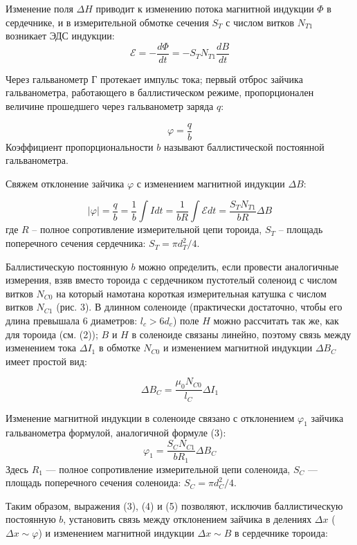 Изменение поля $\Delta H$ приводит к изменению
потока магнитной индукции $\Phi$ в
сердечнике, и в измерительной обмотке
сечения $S_T$ с числом витков $N_{T1}$ возникает
ЭДС индукции:
\[
    \mathscr{E} = - \frac{d\Phi}{dt} =
    -S_T N_{T1} \frac{dB}{dt}
\]

Через гальванометр Г протекает импульс
тока; первый отброс зайчика
гальванометра, работающего в
баллистическом режиме, пропорционален
величине прошедшего через гальванометр
заряда $q$:

\[
\varphi = \frac{q}{b}
\]
Коэффициент пропорциональности $b$ 
называют баллистической постоянной
гальванометра.

Свяжем отклонение зайчика $\varphi$ с
изменением магнитной индукции $\Delta
B$:

\begin{equation}
    |\varphi| = \frac{q}{b} =
    \frac{1}{b}\int I dt = \frac{1}{bR}
    \int \mathscr{E} dt = \frac{S_T
    N_{T1}}{bR}\Delta B
\end{equation}
где $R$ -- полное сопротивление
измерительной цепи тороида, $S_T$ --
площадь поперечного сечения сердечника:
$S_T = \pi d_T^2/4$.

Баллистическую постоянную $b$ можно
определить, если провести аналогичные
измерения, взяв вместо тороида с
сердечником пустотелый соленоид с числом
витков $N_{C0}$ на который намотана короткая
измерительная катушка с числом витков
$N_{C1}$ (рис. 3). В длинном соленоиде
(практически достаточно, чтобы его длина
превышала 6 диаметров: $l_c > 6d_c$)
поле $H$
можно рассчитать так же, как для тороида
(см. (2)); $B$ и $H$ в соленоиде связаны
линейно, поэтому связь между изменением
тока $\Delta I_1$ в обмотке $N_{C0}$ и изменением
магнитной индукции $\Delta B_C$ имеет простой
вид:

\begin{equation}
    \Delta B_C = \frac{\mu_0
    N_{C0}}{l_C}\Delta I_1
\end{equation}

Изменение магнитной индукции в соленоиде
связано с отклонением $\varphi_1$ зайчика
гальванометра формулой, аналогичной
формуле (3):
\begin{equation}
    \varphi_1 = \frac{S_C
    N_{C1}}{bR_1}\Delta B_C
\end{equation}
Здесь $R_1$ — полное сопротивление
измерительной цепи соленоида, $S_C$ —
площадь поперечного сечения соленоида:
$S_C = \pi d_C^2/4$.

Таким образом, выражения (3), (4) и (5)
позволяют, исключив баллистическую
постоянную $b$, установить связь между
отклонением зайчика в делениях $\Delta
x$ ($\Delta x \sim \varphi$) и
изменением магнитной индукции $\Delta x
\sim B$ в сердечнике тороида:

